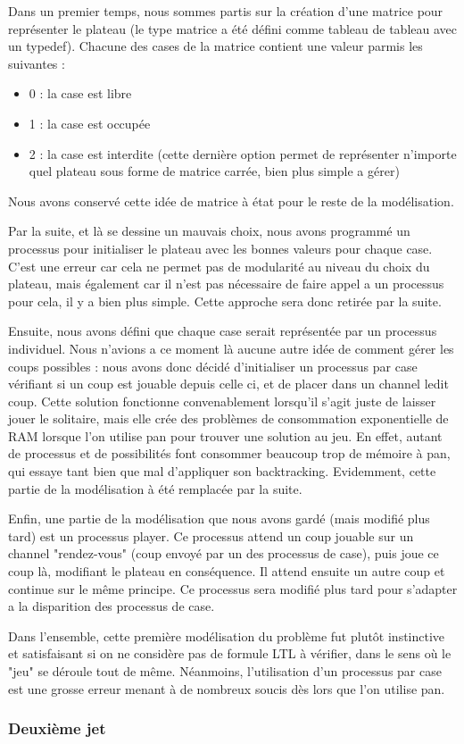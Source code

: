 \documentclass[12pt, a4paper]{report}
\begin{document}
Dans un premier temps, nous sommes partis sur la création d'une matrice pour représenter le plateau (le type matrice a été défini comme tableau de tableau avec un typedef). Chacune des cases de la matrice contient une valeur parmis les suivantes :
\begin{itemize}
\item 0 : la case est libre
\item 1 : la case est occupée
\item 2 : la case est interdite (cette dernière option permet de représenter n'importe quel plateau sous forme de matrice carrée, bien plus simple a gérer)
\end{itemize}
Nous avons conservé cette idée de matrice à état pour le reste de la modélisation.

Par la suite, et là se dessine un mauvais choix, nous avons programmé un processus pour initialiser le plateau avec les bonnes valeurs pour chaque case. C'est une erreur car cela ne permet pas de modularité au niveau du choix du plateau, mais également car il n'est pas nécessaire de faire appel a un processus pour cela, il y a bien plus simple. Cette approche sera donc retirée par la suite.

Ensuite, nous avons défini que chaque case serait représentée par un processus individuel. Nous n'avions a ce moment là aucune autre idée de comment gérer les coups possibles : nous avons donc décidé d'initialiser un processus par case vérifiant si un coup est jouable depuis celle ci, et de placer dans un channel ledit coup. Cette solution fonctionne convenablement lorsqu'il s'agit juste de laisser jouer le solitaire, mais elle crée des problèmes de consommation exponentielle de RAM lorsque l'on utilise pan pour trouver une solution au jeu. En effet, autant de processus et de possibilités font consommer beaucoup trop de mémoire à pan, qui essaye tant bien que mal d'appliquer son backtracking. Evidemment, cette partie de la modélisation à été remplacée par la suite.

Enfin, une partie de la modélisation que nous avons gardé (mais modifié plus tard) est un processus player. Ce processus attend un coup jouable sur un channel "rendez-vous" (coup envoyé par un des processus de case), puis joue ce coup là, modifiant le plateau en conséquence. Il attend ensuite un autre coup et continue sur le même principe. Ce processus sera modifié plus tard pour s'adapter a la disparition des processus de case.

Dans l'ensemble, cette première modélisation du problème fut plutôt instinctive et satisfaisant si on ne considère pas de formule LTL à vérifier, dans le sens où le "jeu" se déroule tout de même. Néanmoins, l'utilisation d'un processus par case est une grosse erreur menant à de nombreux soucis dès lors que l'on utilise pan.

\subsubsection{Deuxième jet}
\end{document}
